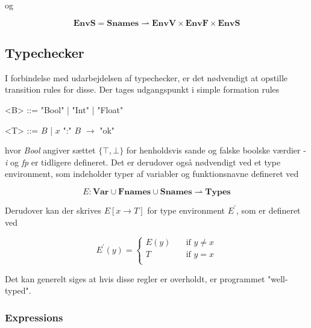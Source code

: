 \noindent og

$$ \textbf{EnvS} = \textbf{Snames} \rightharpoonup \textbf{EnvV} \times \textbf{EnvF} \times \textbf{EnvS} $$

\subsection{Typechecker}
I forbindelse med udarbejdelsen af typechecker, er det nødvendigt at opstille transition rules for disse. Der tages udgangspunkt i simple formation rules

\begin{grammar}
    \centering
    <B> ::= "Bool" | "Int" | "Float"
    
    <T> ::= $B$ | $x$ ":" $B$ $\rightarrow$ "ok"
\end{grammar}

\noindent hvor \textit{Bool} angiver sættet $\{\top, \bot\}$ for henholdsvis sande og falske boolske værdier - \textit{i} og \textit{fp} er tidligere defineret. Det er derudover også nødvendigt ved et type environment, som indeholder typer af variabler og funktionsnavne defineret ved 

$$ E : \textbf{Var} \cup \textbf{Fnames} \cup \textbf{Snames} \rightharpoonup \textbf{Types} $$

\noindent Derudover kan der skrives $E[x \rightarrow T]$ for type environment $E^\prime$, som er defineret ved 

\[ E^\prime(y) =
  \begin{cases}
    E(y)       & \quad \text{if } y \ne x\\
    T          & \quad \text{if } y = x\\
  \end{cases}
\]

\noindent Det kan generelt siges at hvis disse regler er overholdt, er programmet "well-typed"\mbox{}.

\subsubsection{Expressions}

